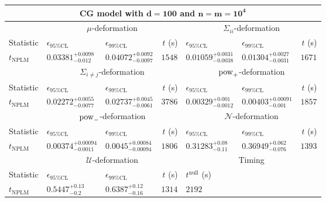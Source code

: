 \begin{tabular}{l|llr|llr}
	\toprule
	\multicolumn{7}{c}{{\bf CG model with $\mathbf{d=100}$ and $\mathbf{n=m=10^{4}}$}} \\
	\toprule
	\multicolumn{1}{c}{} & \multicolumn{3}{c}{$\mu$-deformation} & \multicolumn{3}{c}{$\Sigma_{ii}$-deformation} \\
	Statistic & $\epsilon_{95\%\mathrm{CL}}$ & $\epsilon_{99\%\mathrm{CL}}$ & $t$ (s) & $\epsilon_{95\%\mathrm{CL}}$ & $\epsilon_{99\%\mathrm{CL}}$ & $t$ (s) \\
	\midrule
	$t_{\mathrm{NPLM}}$ & $0.03381_{-0.012}^{+0.0098}$ & $0.04072_{-0.0097}^{+0.0092}$ & $1548$ & $0.01059_{-0.0038}^{+0.0031}$ & $0.01304_{-0.0031}^{+0.0027}$ & $1671$ \\
	\toprule
	\multicolumn{1}{c}{} & \multicolumn{3}{c}{$\Sigma_{i\neq j}$-deformation} & \multicolumn{3}{c}{$\rm{pow}_{+}$-deformation} \\
	Statistic & $\epsilon_{95\%\mathrm{CL}}$ & $\epsilon_{99\%\mathrm{CL}}$ & $t$ (s) & $\epsilon_{95\%\mathrm{CL}}$ & $\epsilon_{99\%\mathrm{CL}}$ & $t$ (s) \\
	\midrule
	$t_{\mathrm{NPLM}}$ & $0.02272_{-0.0077}^{+0.0055}$ & $0.02737_{-0.0061}^{+0.0045}$ & $3786$ & $0.00329_{-0.0012}^{+0.001}$ & $0.00403_{-0.001}^{+0.00091}$ & $1857$ \\
	\toprule
	\multicolumn{1}{c}{} & \multicolumn{3}{c}{$\rm{pow}_{-}$-deformation} & \multicolumn{3}{c}{$\mathcal{N}$-deformation} \\
	Statistic & $\epsilon_{95\%\mathrm{CL}}$ & $\epsilon_{99\%\mathrm{CL}}$ & $t$ (s) & $\epsilon_{95\%\mathrm{CL}}$ & $\epsilon_{99\%\mathrm{CL}}$ & $t$ (s) \\
	\midrule
	$t_{\mathrm{NPLM}}$ & $0.00374_{-0.0011}^{+0.00094}$ & $0.0045_{-0.00094}^{+0.00084}$ & $1806$ & $0.31283_{-0.11}^{+0.08}$ & $0.36949_{-0.076}^{+0.062}$ & $1393$ \\
	\toprule
	\multicolumn{1}{c}{} & \multicolumn{3}{c}{$\mathcal{U}$-deformation} & \multicolumn{3}{c}{Timing} \\
	Statistic & $\epsilon_{95\%\mathrm{CL}}$ & $\epsilon_{99\%\mathrm{CL}}$ & $t$ (s) & $t^{\mathrm{null}}$ (s) \\
	\midrule
	$t_{\mathrm{NPLM}}$ & $0.5447_{-0.2}^{+0.13}$ & $0.6387_{-0.16}^{+0.12}$ & $1314$ & $2192$ \\
	\bottomrule
\end{tabular}